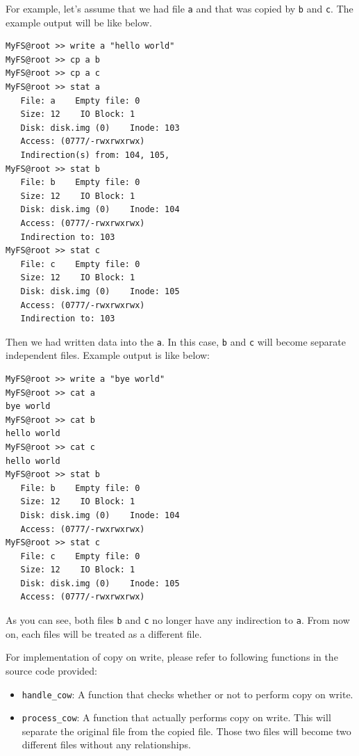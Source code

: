 \documentclass{homework}
\begin{document}
For example, let's assume that we had file \texttt{a} and that was copied by \texttt{b} and \texttt{c}. The example output will be like below.
\\
\begin{center}
\begin{code}
\begin{verbatim}
MyFS@root >> write a "hello world"
MyFS@root >> cp a b
MyFS@root >> cp a c
MyFS@root >> stat a
   File: a    Empty file: 0
   Size: 12    IO Block: 1
   Disk: disk.img (0)    Inode: 103
   Access: (0777/-rwxrwxrwx)
   Indirection(s) from: 104, 105,
MyFS@root >> stat b
   File: b    Empty file: 0
   Size: 12    IO Block: 1
   Disk: disk.img (0)    Inode: 104
   Access: (0777/-rwxrwxrwx)
   Indirection to: 103
MyFS@root >> stat c
   File: c    Empty file: 0
   Size: 12    IO Block: 1
   Disk: disk.img (0)    Inode: 105
   Access: (0777/-rwxrwxrwx)
   Indirection to: 103
\end{verbatim}
\end{code}
\end{center}
Then we had written data into the \texttt{a}. In this case, \texttt{b} and \texttt{c} will become separate independent files. Example output is like below:
\\
\begin{center}
\begin{code}
\begin{verbatim}
MyFS@root >> write a "bye world"
MyFS@root >> cat a
bye world
MyFS@root >> cat b
hello world
MyFS@root >> cat c
hello world
MyFS@root >> stat b
   File: b    Empty file: 0
   Size: 12    IO Block: 1
   Disk: disk.img (0)    Inode: 104
   Access: (0777/-rwxrwxrwx)
MyFS@root >> stat c
   File: c    Empty file: 0
   Size: 12    IO Block: 1
   Disk: disk.img (0)    Inode: 105
   Access: (0777/-rwxrwxrwx)
\end{verbatim}
\end{code}
\end{center}
As you can see, both files \texttt{b} and \texttt{c} no longer have any indirection to \texttt{a}. From now on, each files will be treated as a different file.

For implementation of copy on write, please refer to following functions in the source code provided:
\begin{itemize}
    \item \texttt{handle_cow}: A function that checks whether or not to perform copy on write. 
    \item \texttt{process_cow}: A function that actually performs copy on write. This will separate the original file from the copied file. Those two files will become two different files without any relationships. 
\end{itemize}
\pagebreak
\end{document}
